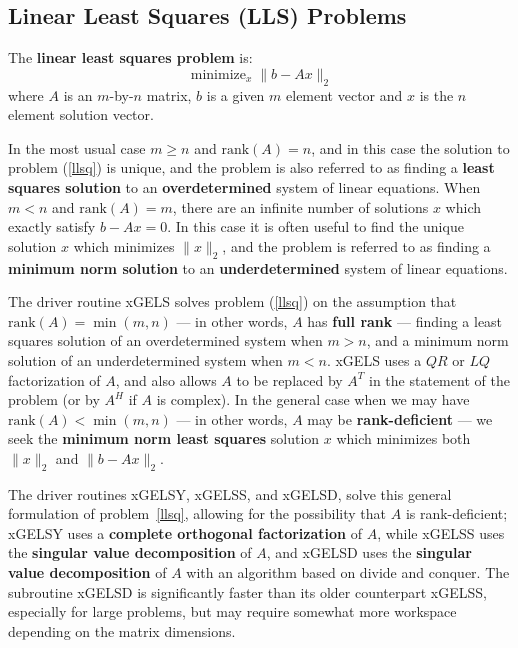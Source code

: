 \clearpage

\subsection{Linear Least Squares (LLS) Problems}\label{subsecdrivellsq}

The {\bf linear least squares problem} is:
\begin{equation}
\label{llsq}
\mathop{\mbox{minimize }}_{x} \| b - A x {\|}_2
\end{equation}
where $A$ is an $m$-by-$n$ matrix, $b$ is a given $m$ element vector
and $x$ is the $n$ element solution vector.

In the most usual case $m \ge n$ and $\mbox{rank}(A) = n$, and in this case the
solution to problem (\ref{llsq}) is unique,
and the problem is also
referred to as finding a {\bf least squares solution} to an
{\bf overdetermined} system of linear equations.
When $m < n$ and $\mbox{rank}(A) = m$, there are an infinite number
 of solutions $x$
which exactly satisfy $b-Ax=0$. In this case it is often useful to find
the unique solution $x$ which minimizes $\|x\|_2$,
and the problem
is referred to as finding a {\bf minimum norm solution} to an
{\bf underdetermined} system of linear equations.

The driver routine xGELS
solves problem (\ref{llsq}) on the assumption that
$\mbox{rank}(A) = \min(m,n)$ --- in other words, $A$ has {\bf full rank} ---
finding a least squares solution of an overdetermined system
when $m > n$, and a minimum norm solution of an underdetermined system
when $m < n$.
xGELS uses a $QR$ or $LQ$ factorization of $A$, and also allows $A$ to be
replaced by $A^T$ in the statement of the problem (or by $A^H$ if $A$ is
complex).
In the general case when we may have
$\mbox{rank}(A) < \min(m,n)$ --- in other words,
$A$ may be {\bf rank-deficient} ---
we seek the {\bf minimum norm least squares} solution $x$
which minimizes both $\|x\|_2$ and $\|b - Ax{\|}_2$.

The driver routines
xGELSY,
xGELSS,
and xGELSD,
solve this general formulation of problem~\ref{llsq},
allowing for the possibility that $A$ is rank-deficient;
xGELSY uses a
{\bf complete orthogonal factorization} of $A$,
while xGELSS uses
the {\bf singular value decomposition} of $A$,
and xGELSD uses
the {\bf singular value decomposition} of $A$ with an algorithm based on
divide and conquer.
The subroutine xGELSD is significantly faster than its older counterpart xGELSS,
especially for large problems, but may require somewhat more workspace depending
on the matrix dimensions.

